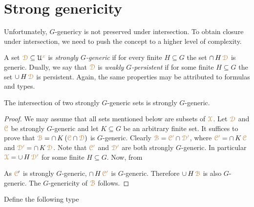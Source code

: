 \section{Strong genericity}\label{strong_genericity}

Unfortunately, $G$-genericy is not preserved under intersection.
To obtain closure under intersection, we need to push the concept to a higher level of complexity.

A set ${\color{brown}\EuScript D}\subseteq\EuScript U^{\color{brown} x}$ is \emph{strongly $G$-generic\/} if for every finite $H\subseteq G$ the set $\cap\,H\,{\color{brown}\EuScript D}$ is generic.
Dually, we say that ${\color{brown}\EuScript D}$ is \emph{weakly $G$-persistent\/} if for some finite $H\subseteq G$ the set $\cup\,H\,{\color{brown}\EuScript D}$ is persistent.
Again, the same properties may be attributed to formulas and types.

\begin{lemma}\label{lem_strongly_generic}
  The intersection of two strongly $G$-generic sets is strongly $G$-generic.
\end{lemma}

\begin{proof}
  We may assume that all sets mentioned below are subsets of ${\color{brown}\EuScript X}$.
  Let ${\color{brown}\EuScript D}$ and ${\color{brown}\EuScript C}$ be strongly $G$-generic and let $K\subseteq G$ be an arbitrary finite set.
  It suffices to prove that ${\color{brown}\EuScript B}=\cap\, K\,({\color{brown}\EuScript C}\cap{\color{brown}\EuScript D})$ is $G$-generic. 
  Clearly ${\color{brown}\EuScript B}={\color{brown}\EuScript C'}\cap{\color{brown}\EuScript D'}$, where ${\color{brown}\EuScript C'}=\cap\, K\,{\color{brown}\EuScript C}$ and ${\color{brown}\EuScript D'}=\cap\, K\,{\color{brown}\EuScript D}$.
  Note that ${\color{brown}\EuScript C'}$ and ${\color{brown}\EuScript D'}$ are both strongly $G$-generic.
  In particular ${\color{brown}\EuScript X}=\cup\,H\,\color{brown}\EuScript D'$ for some finite $H\subseteq G$.
  Now, from
  

  
  
  
  As ${{\color{brown}\EuScript C}'}$ is strongly $G$-generic, $\cap\, H\,{\color{brown}\EuScript C'}$ is $G$-generic.
  Therefore $\cup\,H\,{\color{brown}\EuScript B}$ is also $G$-generic.
  The $G$-genericity of ${\color{brown}\EuScript B}$ follows.
\end{proof}

Define the following type

